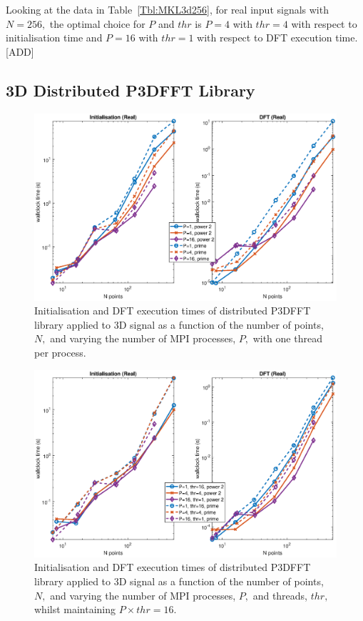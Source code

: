 \documentclass[a4paper]{article}
\begin{document}
Looking at the data in Table~\ref{Tbl:MKL3d256}, for real input signals with $N=256,$ the optimal choice for $P$ and $thr$ is $P=4$ with $thr=4$ with respect to initialisation time and $P=16$ with $thr=1$ with respect to DFT execution time. [ADD]





\subsection{3D Distributed P3DFFT Library}\label{Sec:3DDistP3DFFT}

\begin{figure}[htb]
    \centering
    \includegraphics[width=0.9\linewidth]{../results/p3dfft_3d_mpi.eps}
  \caption{Initialisation and DFT execution times of distributed P3DFFT library applied to 3D signal as a function of the
    number of points, $N,$ and varying the number of MPI processes, $P,$ with one thread per process.}
  \label{3DDistP3DFFT}
\end{figure}

\begin{figure}[htb]
    \centering
    \includegraphics[width=0.9\linewidth]{../results/p3dfft_3d_mpi_thr.eps}
  \caption{Initialisation and DFT execution times of distributed P3DFFT library applied to 3D signal as a function of the
    number of points, $N,$ and varying the number of MPI processes, $P,$ and threads, $thr,$ whilst maintaining $P\times thr=16.$}
  \label{3DDistP3DFFT16}
\end{figure}
\end{document}
